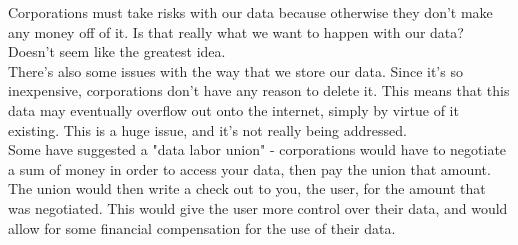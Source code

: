 \documentclass[12pt]{article}
\begin{document}
    Corporations must take risks with our data because otherwise they don't make any money off of it. Is that really what we want to happen with our data?
    Doesn't seem like the greatest idea. \\

    There's also some issues with the way that we store our data. Since it's so inexpensive, corporations don't have any reason to delete it. This means that this
    data may eventually overflow out onto the internet, simply by virtue of it existing. This is a huge issue, and it's not really being addressed. \\

    Some have suggested a "data labor union" - corporations would have to negotiate a sum of money in order to access your data, then pay the union that amount. The
    union would then write a check out to you, the user, for the amount that was negotiated. This would give the user more control over their data, and would allow for
    some financial compensation for the use of their data. \\
\end{document}
